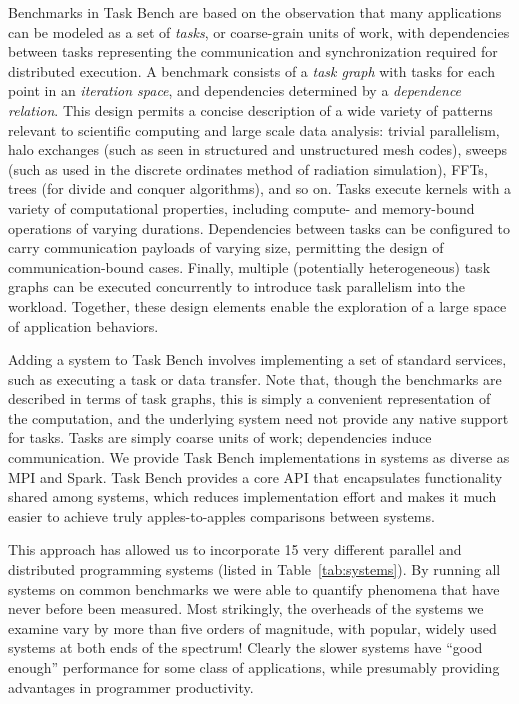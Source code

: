Benchmarks in Task Bench are based on the observation that many applications can be modeled
as a set of \emph{tasks}, or coarse-grain units of work, with
dependencies between tasks representing the communication and synchronization required for
distributed execution. A benchmark consists of a \emph{task graph} with tasks for
each point in an \emph{iteration space}, and dependencies
determined by a \emph{dependence relation}. This design permits a
concise description of a wide variety of patterns relevant to
scientific computing and large scale data analysis: trivial parallelism, halo exchanges (such as
seen in structured and unstructured mesh codes), sweeps (such as used
in the discrete ordinates method of radiation simulation), FFTs, trees
(for divide and conquer algorithms), and so on. Tasks execute kernels with a
variety of computational properties, including compute- and
memory-bound operations of varying durations. Dependencies between
tasks can be configured to carry communication payloads of varying size, permitting
the design of communication-bound cases. Finally, multiple
(potentially heterogeneous) task graphs can be executed concurrently
to introduce task parallelism into the workload. Together, these
design elements enable the exploration of a large space of application
behaviors.

Adding a system to Task Bench involves implementing a set of standard
services, such as executing a task or data transfer. Note that, though
the benchmarks are described in terms of task graphs, this is simply a
convenient representation of the computation, and the underlying
system need not provide any native support for tasks. Tasks are simply
coarse units of work; dependencies induce communication. We provide
Task Bench implementations in systems as diverse as MPI and
Spark. Task Bench provides a core API that encapsulates functionality
shared among systems, which reduces implementation effort and makes it
much easier to achieve truly apples-to-apples comparisons between
systems.

This approach has allowed us to incorporate 15 very different parallel
and distributed programming systems (listed in
Table~\ref{tab:systems}).  By running all systems on common benchmarks
we were able to quantify phenomena
that have never before been measured.
Most strikingly, the overheads of the systems we examine vary by more than five orders
of magnitude, with popular, widely used systems at both ends of the spectrum!  Clearly
the slower systems have ``good enough'' performance for some class of applications, while presumably
providing advantages in programmer productivity.

